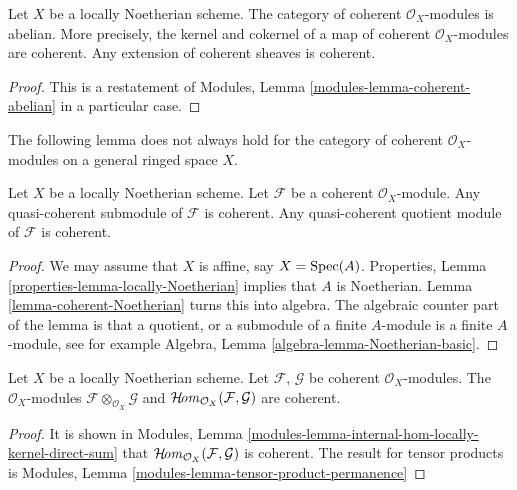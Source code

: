 \begin{lemma}
\label{lemma-coherent-abelian-Noetherian}
Let $X$ be a locally Noetherian scheme.
The category of coherent $\mathcal{O}_X$-modules is abelian.
More precisely, the kernel and cokernel of a map of coherent
$\mathcal{O}_X$-modules are coherent. Any extension
of coherent sheaves is coherent.
\end{lemma}

\begin{proof}
This is a restatement of
Modules, Lemma \ref{modules-lemma-coherent-abelian}
in a particular case.
\end{proof}

\noindent
The following lemma does not always hold for the category of coherent
$\mathcal{O}_X$-modules on a general ringed space $X$.

\begin{lemma}
\label{lemma-coherent-Noetherian-quasi-coherent-sub-quotient}
\begin{reference}
\cite[Chapter II, \S 2, no. 37, Lemma 2 and Proposition 1,
pp. 230--231]{FAC}
\cite[Chapter II, \S 2, no. 39, Proposition 2, pp. 231--232]{FAC}
\end{reference}
Let $X$ be a locally Noetherian scheme.
Let $\mathcal{F}$ be a coherent $\mathcal{O}_X$-module.
Any quasi-coherent submodule of $\mathcal{F}$ is coherent.
Any quasi-coherent quotient module of $\mathcal{F}$ is coherent.
\end{lemma}

\begin{proof}
We may assume that $X$ is affine, say $X = \mathop{\mathrm{Spec}}(A)$.
Properties, Lemma \ref{properties-lemma-locally-Noetherian}
implies that $A$ is Noetherian. Lemma \ref{lemma-coherent-Noetherian}
turns this into algebra. The algebraic counter part of
the lemma is that a quotient, or a submodule of a finite $A$-module
is a finite $A$-module, see for example
Algebra, Lemma \ref{algebra-lemma-Noetherian-basic}.
\end{proof}

\begin{lemma}
\label{lemma-tensor-hom-coherent}
Let $X$ be a locally Noetherian scheme.
Let $\mathcal{F}$, $\mathcal{G}$ be coherent $\mathcal{O}_X$-modules.
The $\mathcal{O}_X$-modules $\mathcal{F} \otimes_{\mathcal{O}_X} \mathcal{G}$
and $\mathop{\mathcal{H}\!\mathit{om}}\nolimits_{\mathcal{O}_X}(\mathcal{F}, \mathcal{G})$ are
coherent.
\end{lemma}

\begin{proof}
It is shown in
Modules, Lemma \ref{modules-lemma-internal-hom-locally-kernel-direct-sum} that
$\mathop{\mathcal{H}\!\mathit{om}}\nolimits_{\mathcal{O}_X}(\mathcal{F}, \mathcal{G})$ is coherent.
The result for tensor products is
Modules, Lemma \ref{modules-lemma-tensor-product-permanence}
\end{proof}

